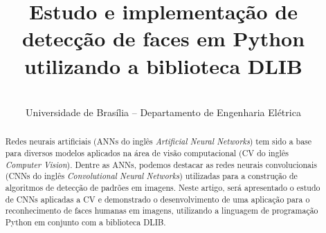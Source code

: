 \documentclass[conference]{IEEEtran}
\begin{document}
\title{Estudo e implementação de detecção de faces em Python utilizando a biblioteca DLIB}


\author{
\and
{}
\\
Universidade de Brasília – Departamento de Engenharia Elétrica
}

\maketitle

\begin{abstract}
 Redes neurais artificiais (ANNs do inglês \textit{Artificial Neural Networks}) tem sido a base para diversos modelos aplicados na área de visão computacional (CV do inglês \textit{Computer Vision}). Dentre as ANNs, podemos destacar as redes neurais convolucionais (CNNs do inglês \textit{Convolutional Neural Networks}) utilizadas para a construção de algoritmos de detecção de padrões em imagens. Neste artigo, será apresentado o estudo de CNNs aplicadas a CV e demonstrado o desenvolvimento de uma aplicação para o reconhecimento de faces humanas em imagens, utilizando a linguagem de programação Python em conjunto com a biblioteca DLIB. 
\end{abstract}
\end{document}
